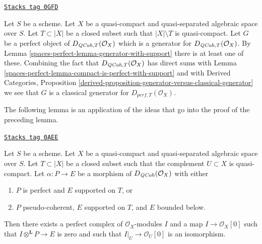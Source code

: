 \begin{remark}
\label{spaces-perfect-remark-classical-generator-with-support}
\href{https://stacks.math.columbia.edu/tag/0GFD}{\texttt{Stacks tag 0GFD}}

Let $S$ be a scheme.
Let $X$ be a quasi-compact and quasi-separated algebraic space over $S$.
Let $T \subset |X|$ be a closed subset such that $|X| \setminus T$
is quasi-compact. Let $G$ be a
perfect object of $D_{\mathit{QCoh}, T}(\mathcal{O}_X)$ which is a generator for
$D_{\mathit{QCoh}, T}(\mathcal{O}_X)$. By Lemma \ref{spaces-perfect-lemma-generator-with-support}
there is at least one of these. Combining the fact that
$D_{\mathit{QCoh}, T}(\mathcal{O}_X)$ has direct sums with
Lemma \ref{spaces-perfect-lemma-compact-is-perfect-with-support} and with
Derived Categories, Proposition
\ref{derived-proposition-generator-versus-classical-generator}
we see that $G$ is a classical generator for $D_{perf, T}(\mathcal{O}_X)$.
\end{remark}

The following lemma is an application of the ideas that go into
the proof of the preceding lemma.

\begin{lemma}
\label{spaces-perfect-lemma-map-from-pseudo-coherent-to-complex-with-support}
\href{https://stacks.math.columbia.edu/tag/0AEE}{\texttt{Stacks tag 0AEE}}

Let $S$ be a scheme. Let $X$ be a quasi-compact and quasi-separated
algebraic space over $S$. Let $T \subset |X|$
be a closed subset such that the complement $U \subset X$ is quasi-compact.
Let $\alpha : P \to E$ be a morphism of $D_{\mathit{QCoh}}(\mathcal{O}_X)$ with
either
\begin{enumerate}
\item $P$ is perfect and $E$ supported on $T$, or
\item $P$ pseudo-coherent, $E$ supported on $T$, and $E$ bounded below.
\end{enumerate}
Then there exists a perfect complex of $\mathcal{O}_X$-modules $I$
and a map $I \to \mathcal{O}_X[0]$ such that
$I \otimes^\mathbf{L} P \to E$ is zero and such that
$I|_U \to \mathcal{O}_U[0]$ is an
isomorphism.
\end{lemma}

